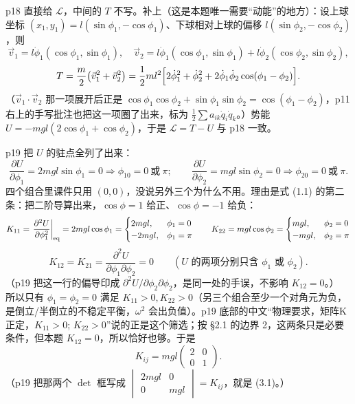 \documentclass[11pt]{ctexart}
\begin{document}
p18 直接给 $\mathcal{L}$，中间的 $T$ 不写。补上（这是本题唯一需要“动能”的地方）：设上球坐标 $(x_1,y_1)=l(\sin\phi_1,-\cos\phi_1)$、下球相对上球的偏移 $l(\sin\phi_2,-\cos\phi_2)$，则
\[
\vec v_1=l\dot\phi_1(\cos\phi_1,\sin\phi_1),\quad
\vec v_2=l\dot\phi_1(\cos\phi_1,\sin\phi_1)+l\dot\phi_2(\cos\phi_2,\sin\phi_2),
\]
\[
T=\frac m2\bigl(\vec v_1^2+\vec v_2^2\bigr)=\frac12ml^2\Bigl[2\dot\phi_1^2+\dot\phi_2^2+2\dot\phi_1\dot\phi_2\cos(\phi_1-\phi_2)\Bigr].
\]
（$\vec v_1\cdot\vec v_2$ 那一项展开后正是 $\cos\phi_1\cos\phi_2+\sin\phi_1\sin\phi_2=\cos(\phi_1-\phi_2)$，p11 右上的手写批注也把这一项圈了出来，标为 $\frac12\sum a_{ik}\dot q_i\dot q_k$。）势能 $U=-mgl(2\cos\phi_1+\cos\phi_2)$，于是 $\mathcal{L}=T-U$ 与 p18 一致。


p19 把 $U$ 的驻点全列了出来：
\[
\frac{\partial U}{\partial\phi_1}=2mgl\sin\phi_1=0\Rightarrow\phi_{10}=0\ \text{或}\ \pi;\qquad
\frac{\partial U}{\partial\phi_2}=mgl\sin\phi_2=0\Rightarrow\phi_{20}=0\ \text{或}\ \pi .
\]
四个组合里课件只用 $(0,0)$，没说另外三个为什么不用。理由是式 (1.1) 的第二条：把二阶导算出来，$\cos\phi=1$ 给正、$\cos\phi=-1$ 给负：
\[
K_{11}=\left.\frac{\partial^2U}{\partial\phi_1^2}\right|_{\rm eq}=2mgl\cos\phi_1=\begin{cases}2mgl,&\phi_1=0\\-2mgl,&\phi_1=\pi\end{cases}
\qquad
K_{22}=mgl\cos\phi_2=\begin{cases}mgl,&\phi_2=0\\-mgl,&\phi_2=\pi\end{cases}
\]
\[
K_{12}=K_{21}=\frac{\partial^2U}{\partial\phi_1\partial\phi_2}=0\qquad(\text{$U$ 的两项分别只含 }\phi_1\text{ 或 }\phi_2).
\]
（p19 把这一行的偏导印成 $\partial^2U/\partial\phi_2\partial\phi_2$，是同一处的手误，不影响 $K_{12}=0$。）
所以只有 $\phi_1=\phi_2=0$ 满足 $K_{11}>0,K_{22}>0$（另三个组合至少一个对角元为负，是倒立/半倒立的不稳定平衡，$\omega^2$ 会出负值）。p19 底部的中文“物理要求，矩阵K正定，$K_{11}>0$; $K_{22}>0$”说的正是这个筛选；按 §2.1 的边界 2，这两条只是必要条件，但本题 $K_{12}=0$，所以恰好也够。于是
\[
K_{ij}=mgl\begin{pmatrix}2&0\\0&1\end{pmatrix}.
\tag{3.1}
\]
（p19 把那两个 $\det$ 框写成 $\begin{vmatrix}2mgl&0\\0&mgl\end{vmatrix}=K_{ij}$，就是 (3.1)。）
\end{document}
